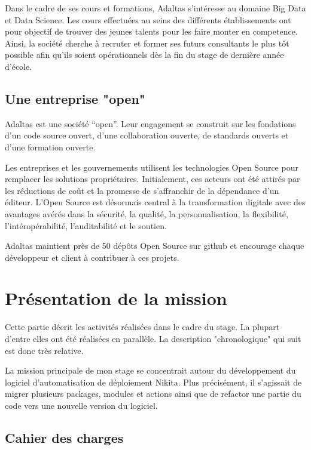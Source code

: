 \documentclass[12pt, french]{report}
\begin{document}
Dans le cadre de ses cours et formations, Adaltas s'intéresse au domaine Big Data et Data Science. Les cours effectuées au seins des différents établissements ont pour objectif de trouver des jeunes talents pour les faire monter en competence. Ainsi, la société cherche à recruter et former ses futurs consultants le plus tôt possible afin qu'ils soient opérationnels dès la fin du stage de dernière année d'école.

\section{Une entreprise "open"}

Adaltas est une société “open”. Leur engagement se construit sur les fondations d’un code source ouvert, d’une collaboration ouverte, de standards ouverts et d’une formation ouverte.

Les entreprises et les gouvernements utilisent les technologies Open Source pour remplacer les solutions propriétaires. Initialement, ces acteurs ont été attirés par les réductions de coût et la promesse de s’affranchir de la dépendance d’un éditeur. L’Open Source est désormais central à la transformation digitale avec des avantages avérés dans la sécurité, la qualité, la personnalisation, la flexibilité, l’intéropérabilité, l’auditabilité et le soutien.

Adaltas maintient près de 50 dépôts Open Source sur \gls{github} et encourage chaque développeur et client à contribuer à ces projets.

\chapter{Présentation de la mission}

Cette partie décrit les activités réalisées dans le cadre du stage. La plupart d'entre elles ont été réalisées en parallèle. La description "chronologique" qui suit est donc très relative.

La mission principale de mon stage se concentrait autour du développement du logiciel d'automatisation de déploiement Nikita. Plus précisément, il s'agissait de migrer plusieurs packages, modules et actions ainsi que de refactor une partie du code vers une nouvelle version du logiciel.

\section{Cahier des charges}
\end{document}
